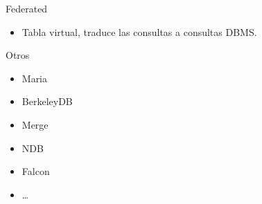 \begin{frame}{Federated}
  \begin{itemize}
    \item Tabla virtual, traduce las consultas a consultas DBMS.
  \end{itemize}
\end{frame}

\begin{frame}{Otros}
  \begin{itemize}
    \item Maria
    \item BerkeleyDB
    \item Merge
    \item NDB
    \item Falcon
    \item \dots
  \end{itemize}
\end{frame}
